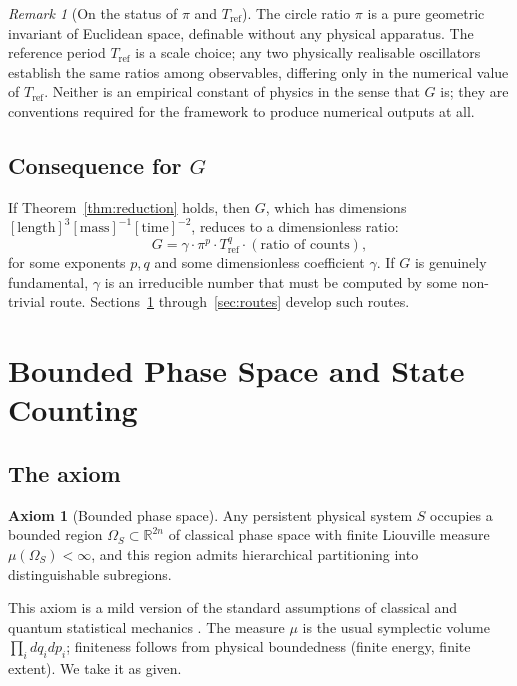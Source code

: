 \documentclass[11pt,twocolumn,a4paper]{article}
\theoremstyle{definition}
\newtheorem{axiom}{Axiom}
\theoremstyle{remark}
\newtheorem{remark}[theorem]{Remark}
\newcommand{\Gnewton}{G}
\begin{document}
\begin{remark}[On the status of $\pi$ and $T_\text{ref}$]
The circle ratio $\pi$ is a pure geometric invariant of Euclidean space, definable without any physical apparatus. The reference period $T_\text{ref}$ is a scale choice; any two physically realisable oscillators establish the same ratios among observables, differing only in the numerical value of $T_\text{ref}$. Neither is an empirical constant of physics in the sense that $\Gnewton$ is; they are conventions required for the framework to produce numerical outputs at all.
\end{remark}

\subsection{Consequence for $\Gnewton$}

If Theorem~\ref{thm:reduction} holds, then $\Gnewton$, which has dimensions $[\text{length}]^3 [\text{mass}]^{-1} [\text{time}]^{-2}$, reduces to a dimensionless ratio:
\begin{equation}
\Gnewton = \gamma \cdot \pi^p \cdot T_\text{ref}^q \cdot (\text{ratio of counts}),
\end{equation}
for some exponents $p, q$ and some dimensionless coefficient $\gamma$. If $\Gnewton$ is genuinely fundamental, $\gamma$ is an irreducible number that must be computed by some non-trivial route. Sections~\ref{sec:counting} through~\ref{sec:routes} develop such routes.

\section{Bounded Phase Space and State Counting}
\label{sec:counting}

\subsection{The axiom}

\begin{axiom}[Bounded phase space]\label{ax:bounded}
Any persistent physical system $S$ occupies a bounded region $\Omega_S \subset \mathbb{R}^{2n}$ of classical phase space with finite Liouville measure $\mu(\Omega_S) < \infty$, and this region admits hierarchical partitioning into distinguishable subregions.
\end{axiom}

This axiom is a mild version of the standard assumptions of classical and quantum statistical mechanics \citep{khinchin1949}. The measure $\mu$ is the usual symplectic volume $\prod_i dq_i dp_i$; finiteness follows from physical boundedness (finite energy, finite extent). We take it as given.
\end{document}
